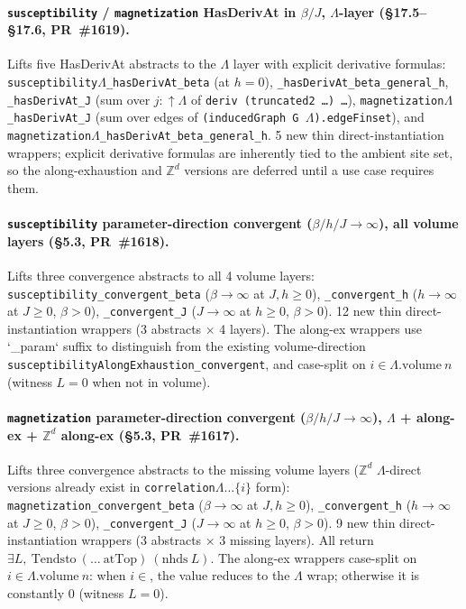 \documentclass[a4paper,11pt]{article}
\newcommand{\LeanLambda}{\texorpdfstring{\ensuremath{\Lambda}}{Lambda}}
\begin{document}
\paragraph{\texttt{susceptibility} / \texttt{magnetization}
HasDerivAt in $\beta/J$, $\Lambda$-layer (\S17.5--\S17.6,
PR~\#1619).} Lifts five HasDerivAt abstracts to the $\Lambda$
layer with explicit derivative formulas:
\texttt{susceptibility\LeanLambda\_hasDerivAt\_beta} (at $h = 0$),
\texttt{\_hasDerivAt\_beta\_general\_h},
\texttt{\_hasDerivAt\_J} (sum over $j : \uparrow\!\Lambda$ of
\texttt{deriv (truncated2 \ldots) \ldots}),
\texttt{magnetization\LeanLambda\_hasDerivAt\_J} (sum over edges of
\texttt{(inducedGraph G $\Lambda$).edgeFinset}), and
\texttt{magnetization\LeanLambda\_hasDerivAt\_beta\_general\_h}. 5 new
thin direct-instantiation wrappers; explicit derivative
formulas are inherently tied to the ambient site set, so the
along-exhaustion and $\mathbb{Z}^d$ versions are deferred until
a use case requires them.

\paragraph{\texttt{susceptibility} parameter-direction convergent
($\beta/h/J \to \infty$), all volume layers (\S5.3, PR~\#1618).}
Lifts three convergence abstracts to all 4 volume layers:
\texttt{susceptibility\_convergent\_beta} ($\beta \to \infty$ at
$J, h \ge 0$),
\texttt{\_convergent\_h} ($h \to \infty$ at $J \ge 0$,
$\beta > 0$), \texttt{\_convergent\_J} ($J \to \infty$ at
$h \ge 0$, $\beta > 0$). 12 new thin direct-instantiation
wrappers (3 abstracts $\times$ 4 layers). The along-ex
wrappers use `\_param` suffix to distinguish from the existing
volume-direction
\texttt{susceptibilityAlongExhaustion\_convergent}, and case-split
on $i \in \Lambda.\mathrm{volume}\ n$ (witness $L = 0$ when not
in volume).

\paragraph{\texttt{magnetization} parameter-direction convergent
($\beta/h/J \to \infty$), $\Lambda$ + along-ex + $\mathbb{Z}^d$
along-ex (\S5.3, PR~\#1617).} Lifts three convergence abstracts
to the missing volume layers ($\mathbb{Z}^d$ $\Lambda$-direct
versions already exist in
\texttt{correlation}$\Lambda \ldots \{i\}$ form):
\texttt{magnetization\_convergent\_beta} ($\beta \to \infty$ at
$J, h \ge 0$),
\texttt{\_convergent\_h} ($h \to \infty$ at $J \ge 0$, $\beta >
0$), \texttt{\_convergent\_J} ($J \to \infty$ at $h \ge 0$,
$\beta > 0$). 9 new thin direct-instantiation wrappers (3
abstracts $\times$ 3 missing layers). All return
$\exists L,\ \mathrm{Tendsto}\ (\ldots\ \mathrm{atTop})\ (\mathrm{nhds}\ L)$.
The along-ex wrappers case-split on
$i \in \Lambda.\mathrm{volume}\ n$: when $i \in$, the value
reduces to the $\Lambda$ wrap; otherwise it is constantly $0$
(witness $L = 0$).
\end{document}
